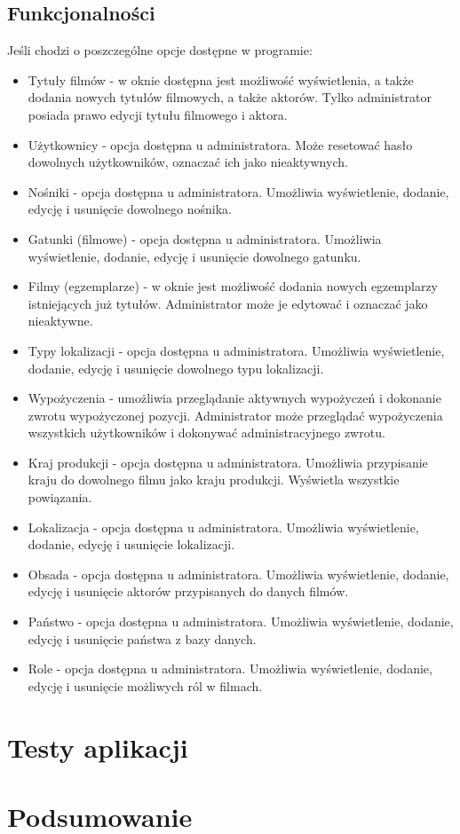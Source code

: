 \documentclass{article}
\begin{document}
\subsection{Funkcjonalności}
Jeśli chodzi o poszczególne opcje dostępne w programie:
\begin{itemize}
\item Tytuły filmów - w oknie dostępna jest możliwość wyświetlenia, a także dodania nowych tytułów filmowych, a także aktorów. Tylko administrator posiada prawo edycji tytułu filmowego i aktora.
\item Użytkownicy - opcja dostępna u administratora. Może resetować hasło dowolnych użytkowników, oznaczać ich jako nieaktywnych.
\item Nośniki - opcja dostępna u administratora. Umożliwia wyświetlenie, dodanie, edycję i usunięcie dowolnego nośnika.
\item Gatunki (filmowe) - opcja dostępna u administratora. Umożliwia wyświetlenie, dodanie, edycję i usunięcie dowolnego gatunku.
\item Filmy (egzemplarze) - w oknie jest możliwość dodania nowych egzemplarzy istniejących już tytułów. Administrator może je edytować i oznaczać jako nieaktywne.
\item Typy lokalizacji - opcja dostępna u administratora. Umożliwia wyświetlenie, dodanie, edycję i usunięcie dowolnego typu lokalizacji.
\item Wypożyczenia - umożliwia przeglądanie aktywnych wypożyczeń i dokonanie zwrotu wypożyczonej pozycji. Administrator może przeglądać wypożyczenia wszystkich użytkowników i dokonywać administracyjnego zwrotu.
\item Kraj produkcji - opcja dostępna u administratora. Umożliwia przypisanie kraju do dowolnego filmu jako kraju produkcji. Wyświetla wszystkie powiązania.
\item Lokalizacja - opcja dostępna u administratora. Umożliwia wyświetlenie, dodanie, edycję i usunięcie lokalizacji. 
\item Obsada - opcja dostępna u administratora. Umożliwia wyświetlenie, dodanie, edycję i usunięcie aktorów przypisanych do danych filmów.
\item Państwo - opcja dostępna u administratora. Umożliwia wyświetlenie, dodanie, edycję i usunięcie państwa z bazy danych.
\item Role - opcja dostępna u administratora. Umożliwia wyświetlenie, dodanie, edycję i usunięcie możliwych ról w filmach.
\end{itemize}
\section{Testy aplikacji}
\section{Podsumowanie}
\end{document}

